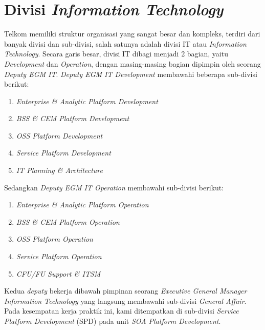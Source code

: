 \section{Divisi \textit{Information Technology}}
\tab Telkom memiliki struktur organisasi yang sangat besar dan kompleks, terdiri dari banyak divisi dan sub-divisi, salah satunya adalah divisi IT atau \textit{Information Technology}. Secara garis besar, divisi IT dibagi menjadi 2 bagian, yaitu \textit{Development} dan \textit{Operation}, dengan masing-masing bagian dipimpin oleh seorang \textit{Deputy EGM IT}. \textit{Deputy EGM IT Development} membawahi beberapa sub-divisi berikut:
\begin{enumerate}
	\item \textit{Enterprise \& Analytic Platform Development}
	\item \textit{BSS \& CEM Platform Development}
	\item \textit{OSS Platform Development}
	\item \textit{Service Platform Development}
	\item \textit{IT Planning \& Architecture}
\end{enumerate}
\tab Sedangkan \textit{Deputy EGM IT Operation} membawahi sub-divisi berikut:
\begin{enumerate}
	\item \textit{Enterprise \& Analytic Platform Operation}
	\item \textit{BSS \& CEM Platform Operation}
	\item \textit{OSS Platform Operation}
	\item \textit{Service Platform Operation}
	\item \textit{CFU/FU Support \& ITSM}
\end{enumerate}
\tab Kedua \textit{deputy} bekerja dibawah pimpinan seorang \textit{Executive General Manager Information Technology} yang langsung membawahi sub-divisi \textit{General Affair}.\\
\tab Pada kesempatan kerja praktik ini, kami ditempatkan di sub-divisi \textit{Service Platform Development} (SPD) pada unit \textit{SOA Platform Development}.

\cleardoublepage
